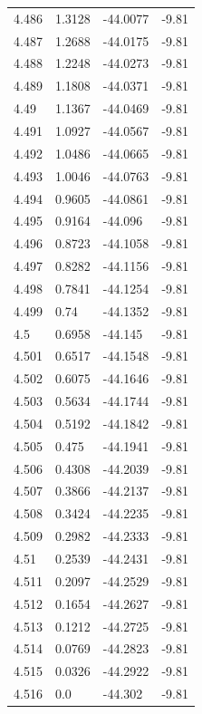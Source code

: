 \begin{tabular}{llll}
4.486 & 1.3128 & -44.0077 & -9.81 \\
4.487 & 1.2688 & -44.0175 & -9.81 \\
4.488 & 1.2248 & -44.0273 & -9.81 \\
4.489 & 1.1808 & -44.0371 & -9.81 \\
4.49 & 1.1367 & -44.0469 & -9.81 \\
4.491 & 1.0927 & -44.0567 & -9.81 \\
4.492 & 1.0486 & -44.0665 & -9.81 \\
4.493 & 1.0046 & -44.0763 & -9.81 \\
4.494 & 0.9605 & -44.0861 & -9.81 \\
4.495 & 0.9164 & -44.096 & -9.81 \\
4.496 & 0.8723 & -44.1058 & -9.81 \\
4.497 & 0.8282 & -44.1156 & -9.81 \\
4.498 & 0.7841 & -44.1254 & -9.81 \\
4.499 & 0.74 & -44.1352 & -9.81 \\
4.5 & 0.6958 & -44.145 & -9.81 \\
4.501 & 0.6517 & -44.1548 & -9.81 \\
4.502 & 0.6075 & -44.1646 & -9.81 \\
4.503 & 0.5634 & -44.1744 & -9.81 \\
4.504 & 0.5192 & -44.1842 & -9.81 \\
4.505 & 0.475 & -44.1941 & -9.81 \\
4.506 & 0.4308 & -44.2039 & -9.81 \\
4.507 & 0.3866 & -44.2137 & -9.81 \\
4.508 & 0.3424 & -44.2235 & -9.81 \\
4.509 & 0.2982 & -44.2333 & -9.81 \\
4.51 & 0.2539 & -44.2431 & -9.81 \\
4.511 & 0.2097 & -44.2529 & -9.81 \\
4.512 & 0.1654 & -44.2627 & -9.81 \\
4.513 & 0.1212 & -44.2725 & -9.81 \\
4.514 & 0.0769 & -44.2823 & -9.81 \\
4.515 & 0.0326 & -44.2922 & -9.81 \\
4.516 & 0.0 & -44.302 & -9.81 \\
\bottomrule
\end{tabular}
